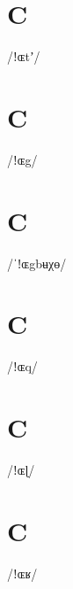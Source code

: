\documentclass[10pt,a4paper,twoside]{book}
\begin{document}
\section*{C}

\begin{multicols}{3}
 {/ǃɶtʼ/} {}
\end{multicols}

\section*{C}

\begin{multicols}{3}
 {/ǃɶg/} {}
\end{multicols}

\section*{C}

\begin{multicols}{3}
 {/ˈǃɶgbʉχɵ/} {}
\end{multicols}

\section*{C}

\begin{multicols}{3}
 {/ǃɶq/} {}
\end{multicols}

\section*{C}

\begin{multicols}{3}
 {/ǃɶɭ/} {}
\end{multicols}

\section*{C}

\begin{multicols}{3}
 {/ǃɶʁ/} {}
\end{multicols}
\end{document}
